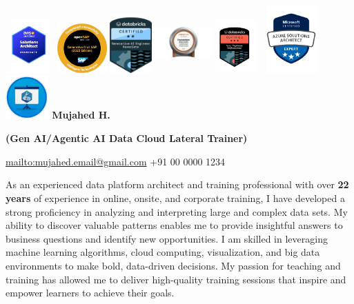 \documentclass[a4paper]{article}
\begin{document}
\includegraphics[width=0.73668in,height=0.81548in]{media/image1.png}
\includegraphics[width=0.74287in,height=0.74561in]{media/image2.jpeg}
\includegraphics[width=0.62821in,height=0.87111in]{media/image3.png}
\includegraphics[width=0.87421in,height=0.92262in]{media/image4.png}
\includegraphics[width=0.60088in,height=0.8017in]{media/image5.png}
\includegraphics[width=0.99074in,height=1.01661in]{media/image6.png}
\includegraphics[width=0.65064in,height=0.65064in]{media/image7.png}
\textbf{Mujahed H.}

\textbf{(Gen AI/Agentic AI Data Cloud Lateral Trainer)}


\url{mailto:mujahed.email@gmail.com} \textbar{} +91 00 0000 1234


As an experienced data platform architect and training professional with
over \textbf{22 years} of experience in online, onsite, and corporate
training, I have developed a strong proficiency in analyzing and
interpreting large and complex data sets. My ability to discover
valuable patterns enables me to provide insightful answers to business
questions and identify new opportunities. I am skilled in leveraging
machine learning algorithms, cloud computing, visualization, and big
data environments to make bold, data-driven decisions. My passion for
teaching and training has allowed me to deliver high-quality training
sessions that inspire and empower learners to achieve their goals.
\end{document}
